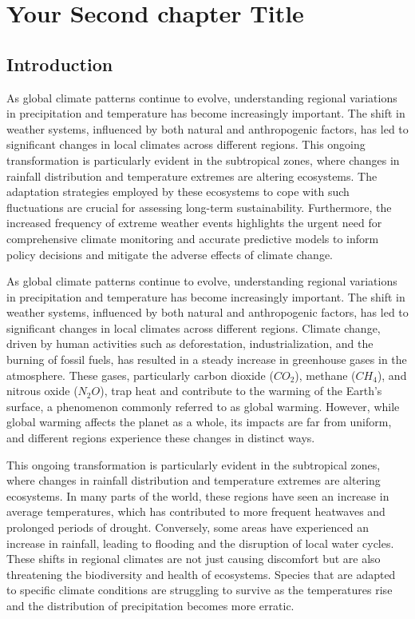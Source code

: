 \chapter{Your Second chapter Title} \label{Chapter: 2}

\newpage
\section{Introduction}
\justifying
{\huge A}s global climate patterns continue to evolve, understanding regional variations in precipitation and temperature has become increasingly important. The shift in weather systems, influenced by both natural and anthropogenic factors, has led to significant changes in local climates across different regions. This ongoing transformation is particularly evident in the subtropical zones, where changes in rainfall distribution and temperature extremes are altering ecosystems. The adaptation strategies employed by these ecosystems to cope with such fluctuations are crucial for assessing long-term sustainability. Furthermore, the increased frequency of extreme weather events highlights the urgent need for comprehensive climate monitoring and accurate predictive models to inform policy decisions and mitigate the adverse effects of climate change.


As global climate patterns continue to evolve, understanding regional variations in precipitation and temperature has become increasingly important. The shift in weather systems, influenced by both natural and anthropogenic factors, has led to significant changes in local climates across different regions. Climate change, driven by human activities such as deforestation, industrialization, and the burning of fossil fuels, has resulted in a steady increase in greenhouse gases in the atmosphere. These gases, particularly carbon dioxide (\(CO_2\)), methane (\(CH_4\)), and nitrous oxide (\(N_2O\)), trap heat and contribute to the warming of the Earth’s surface, a phenomenon commonly referred to as global warming. However, while global warming affects the planet as a whole, its impacts are far from uniform, and different regions experience these changes in distinct ways.

This ongoing transformation is particularly evident in the subtropical zones, where changes in rainfall distribution and temperature extremes are altering ecosystems. In many parts of the world, these regions have seen an increase in average temperatures, which has contributed to more frequent heatwaves and prolonged periods of drought. Conversely, some areas have experienced an increase in rainfall, leading to flooding and the disruption of local water cycles. These shifts in regional climates are not just causing discomfort but are also threatening the biodiversity and health of ecosystems. Species that are adapted to specific climate conditions are struggling to survive as the temperatures rise and the distribution of precipitation becomes more erratic.

